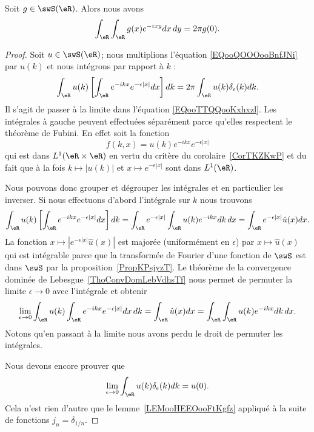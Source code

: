 \begin{proposition}
    Soit \( g\in\swS(\eR)\). Alors nous avons
    \begin{equation}        \label{EQooBOJUooQGvMrk}
        \int_{\eR}\int_{\eR} g(x) e^{-ixy}dx\,dy=2\pi g(0).
    \end{equation}
\end{proposition}

\begin{proof}
    Soit \( u\in\swS(\eR)\); nous multiplions l'équation \eqref{EQooQOOOooBnfJNi} par \( u(k)\) et nous intégrons par rapport à \( k\) :
    \begin{equation}        \label{EQooTTQQooKxhxzl}
        \int_{\eR}u(k)\left[ \int_{\eR} e^{-ikx} e^{-\epsilon| x |}dx \right]dk=2\pi\int_{\eR}u(k)\delta_{\epsilon}(k)dk.
    \end{equation}
    Il s'agit de passer à la limite dans l'équation \eqref{EQooTTQQooKxhxzl}. Les intégrales à gauche peuvent effectuées séparément parce qu'elles respectent le théorème de Fubini. En effet soit la fonction
    \begin{equation}
        f(k,x)=u(k) e^{-ikx} e^{-\epsilon| x |}
    \end{equation}
    qui est dans \( L^1(\eR\times \eR)\) en vertu du critère du corolaire~\ref{CorTKZKwP} et du fait que à la fois \( k\mapsto | u(k) | \) et \( x\mapsto  e^{-\epsilon| x |}\) sont dans \( L^1(\eR)\).

    Nous pouvons donc grouper et dégrouper les intégrales et en particulier les inverser. Si nous effectuons d'abord l'intégrale sur \( k\) nous trouvons
    \begin{equation}
        \int_{\eR}u(k)\left[ \int_{\eR} e^{-ikx} e^{-\epsilon| x |}dx \right]dk=\int_{\eR} e^{-\epsilon| x |}\int_{\eR}u(k) e^{-ikx}dk\,dx=\int_{\eR} e^{-\epsilon| x |}\hat u(x)dx.
    \end{equation}
    La fonction \( x\mapsto |  e^{-\epsilon| x |}\hat u(x) |\) est majorée (uniformément en \( \epsilon\)) par \( x\mapsto \hat u(x)\) qui est intégrable parce que la transformée de Fourier d'une fonction de \( \swS\) est dans \( \swS\) par la proposition~\ref{PropKPsjyzT}. Le théorème de la convergence dominée de Lebesgue~\ref{ThoConvDomLebVdhsTf} nous permet de permuter la limite \( \epsilon\to 0 \) avec l'intégrale et obtenir
    \begin{equation}
        \lim_{\epsilon\to 0}\int_{\eR}u(k)\int_{\eR} e^{-ikx} e^{-\epsilon| x |}dx\,dk=\int_{\eR}\hat u(x)dx=\int_{\eR}\int_{\eR}u(k) e^{-ikx}dk\,dx.
    \end{equation}
    Notons qu'en passant à la limite nous avons perdu le droit de permuter les intégrales.

    Nous devons encore prouver que
    \begin{equation}
        \lim_{\epsilon\to 0}\int_{\eR}u(k)\delta_{\epsilon}(k)dk=u(0).
    \end{equation}
    Cela n'est rien d'autre que le lemme~\ref{LEMooHEEOooFtKgfz} appliqué à la suite de fonctions \( j_n=\delta_{1/n}\).
\end{proof}

